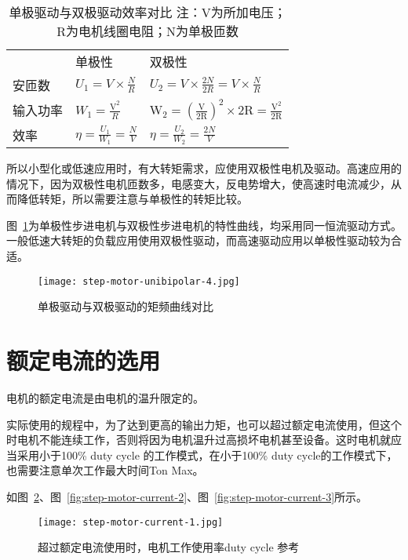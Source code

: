 \begin{table}[htbp]
    \centering
    \begin{tabular}{lll}
     & 单极性 & 双极性 \\
    安匝数 & $U_{1}=V \times \frac{N}{R}$ & $U_{2}=V \times \frac{2N}{2R}=V \times \frac{N}{R}$\\
    输入功率 & $W_{1}=\frac{\mathrm{V}^{2}}{R}$ & $\mathrm{W}_{2}=(\frac{\mathrm{V}}{2 \mathrm{R}} )^{2} \times  2 \mathrm{R}=\frac{\mathrm{V}^{2}}{2 \mathrm{R}} $ \\
    效率 & $\eta = \frac{U_{1}}{W_{1}} = \frac{N}{V}$ & $\eta = \frac{U_{2}}{W_{2}} = \frac{2N}{V}$
    \end{tabular}
    \caption{单极驱动与双极驱动效率对比 注：V为所加电压；R为电机线圈电阻；N为单极匝数}
    \label{tab:step-motor-unibipolar}
\end{table}

所以小型化或低速应用时，有大转矩需求，应使用双极性电机及驱动。高速应用的情况下，因为双极性电机匝数多，电感变大，反电势增大，使高速时电流减少，从而降低转矩，所以需要注意与单极性的转矩比较。

图~\ref{fig:step-motor-unibipolar-4}为单极性步进电机与双极性步进电机的特性曲线，均采用同一恒流驱动方式。一般低速大转矩的负载应用使用双极性驱动，而高速驱动应用以单极性驱动较为合适。

\begin{figure}[htbp]
    \centering
    \texttt{[image: step-motor-unibipolar-4.jpg]}
    \caption{单极驱动与双极驱动的矩频曲线对比}
    \label{fig:step-motor-unibipolar-4}
\end{figure}

\section{额定电流的选用}

电机的额定电流是由电机的温升限定的。

实际使用的规程中，为了达到更高的输出力矩，也可以超过额定电流使用，但这个时电机不能连续工作，否则将因为电机温升过高损坏电机甚至设备。这时电机就应当采用小于100\% duty cycle 的工作模式，在小于100\% duty cycle的工作模式下，也需要注意单次工作最大时间Ton Max。

如图~\ref{fig:step-motor-current-1}、图~\ref{fig:step-motor-current-2}、图~\ref{fig:step-motor-current-3}所示。

\begin{figure}[htbp]
    \centering
    \texttt{[image: step-motor-current-1.jpg]}
    \caption{超过额定电流使用时，电机工作使用率duty cycle 参考}
    \label{fig:step-motor-current-1}
\end{figure}

